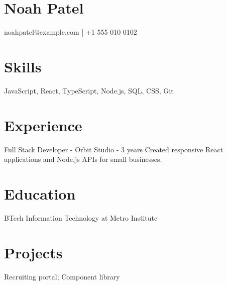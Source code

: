 \section*{Noah Patel}
noahpatel@example.com | +1 555 010 0102
\section*{Skills}
JavaScript, React, TypeScript, Node.js, SQL, CSS, Git
\section*{Experience}
Full Stack Developer - Orbit Studio - 3 years
Created responsive React applications and Node.js APIs for small businesses.
\section*{Education}
BTech Information Technology at Metro Institute
\section*{Projects}
Recruiting portal; Component library
